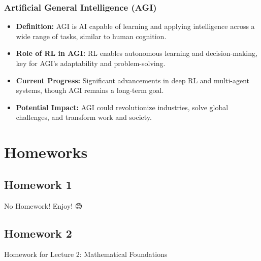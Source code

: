 \documentclass[
  letterpaper,
  DIV=11,
  numbers=noendperiod]{scrreprt}
\begin{document}
\section{Artificial General Intelligence
(AGI)}\label{artificial-general-intelligence-agi}

\begin{itemize}
\item
  \textbf{Definition:} AGI is AI capable of learning and applying
  intelligence across a wide range of tasks, similar to human cognition.
\item
  \textbf{Role of RL in AGI:} RL enables autonomous learning and
  decision-making, key for AGI's adaptability and problem-solving.
\item
  \textbf{Current Progress:} Significant advancements in deep RL and
  multi-agent systems, though AGI remains a long-term goal.
\item
  \textbf{Potential Impact:} AGI could revolutionize industries, solve
  global challenges, and transform work and society.
\end{itemize}

\part{Homeworks}

\chapter{Homework 1}\label{homework-1}

\begin{tcolorbox}[enhanced jigsaw, colback=white, left=2mm, breakable, opacityback=0, bottomrule=.15mm, rightrule=.15mm, arc=.35mm, colframe=quarto-callout-note-color-frame, leftrule=.75mm, toprule=.15mm]

No Homework! Enjoy! 😊

\end{tcolorbox}

\chapter{Homework 2}\label{homework-2}

\begin{tcolorbox}[enhanced jigsaw, colback=white, left=2mm, breakable, opacityback=0, bottomrule=.15mm, rightrule=.15mm, arc=.35mm, colframe=quarto-callout-note-color-frame, leftrule=.75mm, toprule=.15mm]

Homework for Lecture 2: Mathematical Foundations 📝

\end{tcolorbox}
\end{document}
